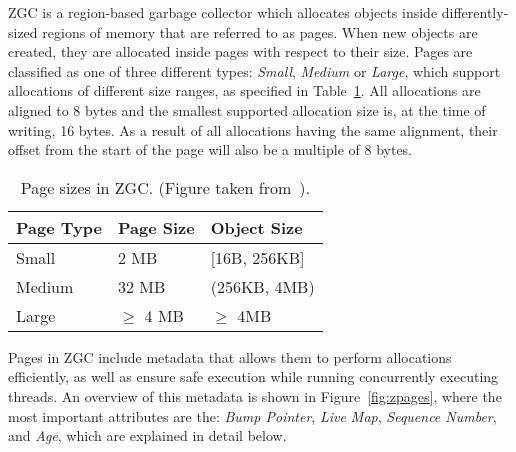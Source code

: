 
ZGC is a region-based garbage collector which allocates objects inside differently-sized regions of memory that are referred to as pages. When new objects are created, they are allocated inside pages with respect to their size. Pages are classified as one of three different types: \textit{Small}, \textit{Medium} or \textit{Large}, which support allocations of different size ranges, as specified in Table~\ref{table:zpage_sizes}. All allocations are aligned to 8 bytes and the smallest supported allocation size is, at the time of writing, 16 bytes. As a result of all allocations having the same alignment, their offset from the start of the page will also be a multiple of 8 bytes.

\begin{table}[H]
    \centering
    \begin{tabular}{lllll}
        Page Type   & Page Size     & \multicolumn{3}{l}{Object Size}      \\ \hline
        Small       & 2 MB          & \multicolumn{3}{l}{{[}16B, 256KB{]}} \\
        Medium      & 32 MB         & \multicolumn{3}{l}{(256KB, 4MB)}     \\
        Large       & $\geq$ 4 MB   & \multicolumn{3}{l}{$\geq$ 4MB}       \\
    \end{tabular}
    \caption{Page sizes in ZGC. (Figure taken from~\cite{zpage_size_table}). }
    \label{table:zpage_sizes}
\end{table}

Pages in ZGC include metadata that allows them to perform allocations efficiently, as well as ensure safe execution while running concurrently executing threads. An overview of this metadata is shown in Figure~\ref{fig:zpages}, where the most important attributes are the: \textit{Bump Pointer}, \textit{Live Map}, \textit{Sequence Number}, and \textit{Age}, which are explained in detail below.

